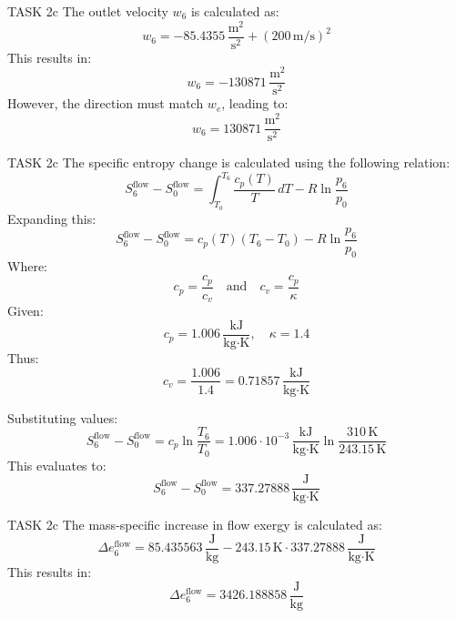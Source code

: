 TASK 2c  
The outlet velocity \( w_6 \) is calculated as:  
\[
w_6 = -85.4355 \, \frac{\text{m}^2}{\text{s}^2} + (200 \, \text{m/s})^2
\]  
This results in:  
\[
w_6 = -130871 \, \frac{\text{m}^2}{\text{s}^2}
\]  
However, the direction must match \( w_e \), leading to:  
\[
w_6 = 130871 \, \frac{\text{m}^2}{\text{s}^2}
\]

TASK 2c  
The specific entropy change is calculated using the following relation:  
\[
S_{6}^\text{flow} - S_{0}^\text{flow} = \int_{T_0}^{T_6} \frac{c_p(T)}{T} \, dT - R \ln \frac{p_6}{p_0}
\]  
Expanding this:  
\[
S_{6}^\text{flow} - S_{0}^\text{flow} = c_p(T) (T_6 - T_0) - R \ln \frac{p_6}{p_0}
\]  
Where:  
\[
c_p = \frac{c_p}{c_v} \quad \text{and} \quad c_v = \frac{c_p}{\kappa}
\]  
Given:  
\[
c_p = 1.006 \, \frac{\text{kJ}}{\text{kg·K}}, \quad \kappa = 1.4
\]  
Thus:  
\[
c_v = \frac{1.006}{1.4} = 0.71857 \, \frac{\text{kJ}}{\text{kg·K}}
\]

Substituting values:  
\[
S_{6}^\text{flow} - S_{0}^\text{flow} = c_p \ln \frac{T_6}{T_0} = 1.006 \cdot 10^{-3} \, \frac{\text{kJ}}{\text{kg·K}} \ln \frac{310 \, \text{K}}{243.15 \, \text{K}}
\]  
This evaluates to:  
\[
S_{6}^\text{flow} - S_{0}^\text{flow} = 337.27888 \, \frac{\text{J}}{\text{kg·K}}
\]

TASK 2c  
The mass-specific increase in flow exergy is calculated as:  
\[
\Delta e_{6}^\text{flow} = 85.435563 \, \frac{\text{J}}{\text{kg}} - 243.15 \, \text{K} \cdot 337.27888 \, \frac{\text{J}}{\text{kg·K}}
\]  
This results in:  
\[
\Delta e_{6}^\text{flow} = 3426.188858 \, \frac{\text{J}}{\text{kg}}
\]